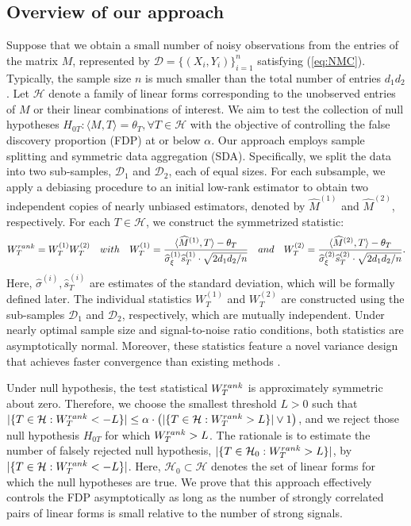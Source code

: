 \documentclass[12pt]{article}
\def\calD{{\mathcal D}}
\def\calH{{\mathcal H}}
\theoremstyle{plain}
\begin{document}
\begin{sloppypar}
\subsection{Overview of our approach}
Suppose that we obtain a small number of noisy observations from the entries of the matrix $M$, represented by $\calD=\{(X_i, Y_i)\}_{i=1}^{n}$ satisfying (\ref{eq:NMC}). Typically, the sample size $n$ is much smaller than the total number of entries $d_1d_2$. Let $\calH$ denote a family of linear forms corresponding to the unobserved entries of $M$ or their linear combinations of interest. We aim to test the collection of null hypotheses $H_{0T}:\langle M, T\rangle=\theta_T, \forall T\in\calH$ with the objective of controlling the false discovery proportion (FDP) at or below $\alpha$. Our approach employs sample splitting and symmetric data aggregation (SDA). Specifically, we split the data into two sub-samples, $\calD_1$ and $\calD_2$, each of equal sizes. For each subsample, we apply a debiasing procedure to an initial low-rank estimator to obtain two independent copies of nearly unbiased estimators, denoted by $\widehat M^{(1)}$ and $\widehat M^{(2)}$, respectively. For each $T\in\calH$, we construct the symmetrized statistic:
$$
W_T^{\rm rank}=W_T^{(1)} W_T^{(2)}\quad {\rm with}\quad W_T^{(1)}=\frac{\langle \widehat M^{(1)}, T\rangle-\theta_T}{\widehat \sigma_{\xi}^{(1)}\widehat s_T^{(1)}\cdot\sqrt{2d_1d_2/n}}\quad {\rm and}\quad W_T^{(2)}=\frac{\langle \widehat M^{(2)}, T\rangle-\theta_T}{\widehat \sigma_{\xi}^{(2)}\widehat s_T^{(2)}\cdot\sqrt{2d_1d_2/n}}.
$$
Here, $\widehat{\sigma}^{(i)}, \widehat s_T^{(i)}$ are estimates of the standard deviation, which will be formally defined later.
The individual statistics $W_T^{(1)}$ and $W_T^{(2)}$ are constructed using the sub-samples $\calD_1$ and $\calD_2$, respectively, which are mutually independent. Under nearly optimal sample size and signal-to-noise ratio conditions, both statistics are asymptotically normal. Moreover, these statistics feature a novel variance design that achieves faster convergence than existing methods \citep{chen2019inference, xia2021statistical}.

Under null hypothesis, the test statistical $W_T^{\rm rank}$ is approximately symmetric about zero. Therefore, we choose the smallest threshold $L>0$ such that $|\{T\in\calH: W_T^{\rm rank}< -L\}|\leq \alpha \cdot \big(|\{T\in\calH: W_T^{\rm rank} >L\}|\vee 1\big)$, and we reject those null hypothesis $H_{0T}$ for which $W_T^{\rm rank}>L$. The rationale is to estimate the number of falsely rejected null hypothesis, $|\{T\in\calH_0: W_T^{\rm rank}>L\}|$, by $|\{T\in\calH: W_T^{\rm rank}< -L\}|$. Here, $\calH_0\subset \calH$ denotes the set of linear forms for which the null hypotheses are true. We prove that this approach effectively controls the FDP asymptotically as long as the number of strongly correlated pairs of linear forms is small relative to the number of strong signals.


\end{sloppypar}
\end{document}
